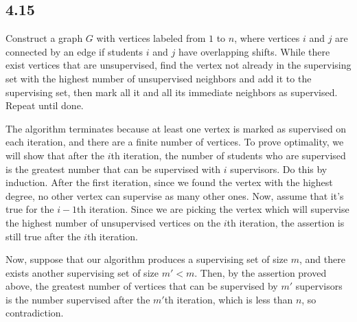 \documentclass{article}
\begin{document}
\subsection*{4.15}
Construct a graph $G$ with vertices labeled from $1$ to $n$, where vertices $i$ and $j$ are connected by an edge if students $i$ and $j$ have overlapping shifts. While there exist vertices that are unsupervised, find the vertex not already in the supervising set with the highest number of unsupervised neighbors and add it to the supervising set, then mark all it and all its immediate neighbors as supervised.  Repeat until done.

The algorithm terminates because at least one vertex is marked as supervised on each iteration, and there are a finite number of vertices. To prove optimality, we will show that after the $i$th iteration, the number of students who are supervised is the greatest number that can be supervised with $i$ supervisors. Do this by induction. After the first iteration, since we found the vertex with the highest degree, no other vertex can supervise as many other ones. Now, assume that it's true for the $i-1$th iteration. Since we are picking the vertex which will supervise the highest number of unsupervised vertices on the $i$th iteration, the assertion is still true after the $i$th iteration. 

Now, suppose that our algorithm produces a supervising set of size $m$, and there exists another supervising set of size $m'<m$. Then, by the assertion proved above, the greatest number of vertices that can be supervised by $m'$ supervisors is the number supervised after the $m'$th iteration, which is less than $n$, so contradiction.
\end{document}
